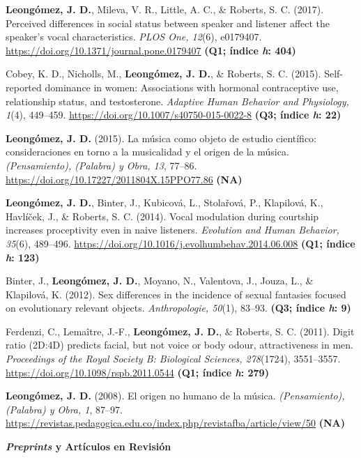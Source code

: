 \documentclass[11pt,a4paper,]{awesome-cv}
\begin{document}
\textbf{Leongómez, J. D.}, Mileva, V. R., Little, A. C., \& Roberts, S.
C. (2017). Perceived differences in social status between speaker and
listener affect the speaker's vocal characteristics. \emph{PLOS One,
12}(6), e0179407. \url{https://doi.org/10.1371/journal.pone.0179407}
\textbf{(Q1; índice \emph{h}: 404)}

Cobey, K. D., Nicholls, M., \textbf{Leongómez, J. D.}, \& Roberts, S. C.
(2015). Self-reported dominance in women: Associations with hormonal
contraceptive use, relationship status, and testosterone. \emph{Adaptive
Human Behavior and Physiology, 1}(4), 449--459.
\url{https://doi.org/10.1007/s40750-015-0022-8} \textbf{(Q3; índice
\emph{h}: 22)}

\textbf{Leongómez, J. D.} (2015). La música como objeto de estudio
científico: consideraciones en torno a la musicalidad y el origen de la
música. \emph{(Pensamiento), (Palabra) y Obra, 13}, 77--86.
\url{https://doi.org/10.17227/2011804X.15PPO77.86} \textbf{(NA)}

\textbf{Leongómez, J. D.}, Binter, J., Kubicová, L., Stolařová, P.,
Klapilová, K., Havlíček, J., \& Roberts, S. C. (2014). Vocal modulation
during courtship increases proceptivity even in naive listeners.
\emph{Evolution and Human Behavior, 35}(6), 489--496.
\url{https://doi.org/10.1016/j.evolhumbehav.2014.06.008} \textbf{(Q1;
índice \emph{h}: 123)}

Binter, J., \textbf{Leongómez, J. D.}, Moyano, N., Valentova, J., Jouza,
L., \& Klapilová, K. (2012). Sex differences in the incidence of sexual
fantasies focused on evolutionary relevant objects. \emph{Anthropologie,
50}(1), 83--93. \textbf{(Q3; índice \emph{h}: 9)}

Ferdenzi, C., Lemaître, J.-F., \textbf{Leongómez, J. D.}, \& Roberts, S.
C. (2011). Digit ratio (2D:4D) predicts facial, but not voice or body
odour, attractiveness in men. \emph{Proceedings of the Royal Society B:
Biological Sciences, 278}(1724), 3551--3557.
\url{https://doi.org/10.1098/rspb.2011.0544} \textbf{(Q1; índice
\emph{h}: 279)}

\textbf{Leongómez, J. D.} (2008). El origen no humano de la música.
\emph{(Pensamiento), (Palabra) y Obra, 1}, 87--97.
\url{https://revistas.pedagogica.edu.co/index.php/revistafba/article/view/50}
\textbf{(NA)}

\endgroup

\blacktriangleright\blacktriangleright\blacktriangleright\space \textbf{\textit{Preprints} y Artículos en Revisión}

\begingroup
\footnotesize
\setlength{\parindent}{-0.5in}
\setlength{\leftskip}{0.5in}
\end{document}
